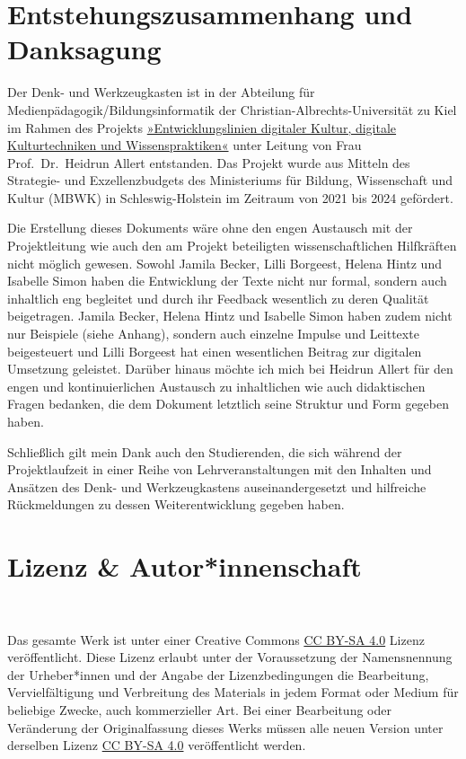 \documentclass[
  a4paper,
]{book}
\begin{document}
\section{Entstehungszusammenhang und Danksagung}\label{entstehungszusammenhang-und-danksagung}

Der Denk- und Werkzeugkasten ist in der Abteilung für Medienpädagogik/Bildungsinformatik der Christian-Albrechts-Universität zu Kiel im Rahmen des Projekts \href{https://www.medienpaedagogik.uni-kiel.de/de/profil/entwicklungslinien-digitaler-kultur-digitale-kulturtechniken-und-wissenspraktiken}{»Entwicklungslinien digitaler Kultur, digitale Kulturtechniken und Wissenspraktiken«} unter Leitung von Frau Prof.~Dr.~Heidrun Allert entstanden. Das Projekt wurde aus Mitteln des Strategie- und Exzellenzbudgets des Ministeriums für Bildung, Wissenschaft und Kultur (MBWK) in Schleswig-Holstein im Zeitraum von 2021 bis 2024 gefördert.

Die Erstellung dieses Dokuments wäre ohne den engen Austausch mit der Projektleitung wie auch den am Projekt beteiligten wissenschaftlichen Hilfkräften nicht möglich gewesen. Sowohl Jamila Becker, Lilli Borgeest, Helena Hintz und Isabelle Simon haben die Entwicklung der Texte nicht nur formal, sondern auch inhaltlich eng begleitet und durch ihr Feedback wesentlich zu deren Qualität beigetragen. Jamila Becker, Helena Hintz und Isabelle Simon haben zudem nicht nur Beispiele (siehe Anhang), sondern auch einzelne Impulse und Leittexte beigesteuert und Lilli Borgeest hat einen wesentlichen Beitrag zur digitalen Umsetzung geleistet. Darüber hinaus möchte ich mich bei Heidrun Allert für den engen und kontinuierlichen Austausch zu inhaltlichen wie auch didaktischen Fragen bedanken, die dem Dokument letztlich seine Struktur und Form gegeben haben.

Schließlich gilt mein Dank auch den Studierenden, die sich während der Projektlaufzeit in einer Reihe von Lehrveranstaltungen mit den Inhalten und Ansätzen des Denk- und Werkzeugkastens auseinandergesetzt und hilfreiche Rückmeldungen zu dessen Weiterentwicklung gegeben haben.

\section{Lizenz \& Autor*innenschaft}\label{lizenz-autorinnenschaft}

~

Das gesamte Werk ist unter einer Creative Commons \href{https://creativecommons.org/licenses/by-sa/4.0/}{CC BY-SA 4.0} Lizenz veröffentlicht. Diese Lizenz erlaubt unter der Voraussetzung der Namensnennung der Urheber*innen und der Angabe der Lizenzbedingungen die Bearbeitung, Vervielfältigung und Verbreitung des Materials in jedem Format oder Medium für beliebige Zwecke, auch kommerzieller Art. Bei einer Bearbeitung oder Veränderung der Originalfassung dieses Werks müssen alle neuen Version unter derselben Lizenz \href{https://creativecommons.org/licenses/by-sa/4.0/}{CC BY-SA 4.0} veröffentlicht werden.
\end{document}
